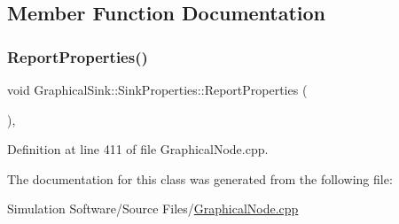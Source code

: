 \subsection{Member Function Documentation}
\mbox{\label{class_graphical_sink_1_1_sink_properties_a382b537cdfe64ca999284f9a012aa1ab}} 
\subsubsection{\texorpdfstring{Report\+Properties()}{ReportProperties()}}
{\footnotesize\ttfamily void Graphical\+Sink\+::\+Sink\+Properties\+::\+Report\+Properties (\begin{DoxyParamCaption}{ }\end{DoxyParamCaption})\hspace{0.3cm}{\ttfamily [inline]}, {\ttfamily [override]}}



Definition at line 411 of file Graphical\+Node.\+cpp.



The documentation for this class was generated from the following file\+:\begin{DoxyCompactItemize}
\item 
Simulation Software/\+Source Files/\hyperlink{_graphical_node_8cpp}{Graphical\+Node.\+cpp}\end{DoxyCompactItemize}

